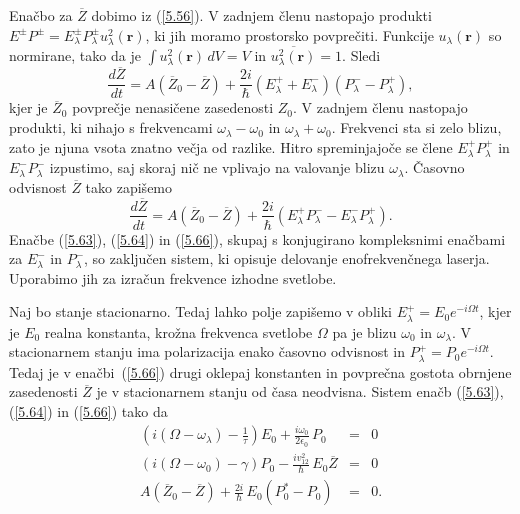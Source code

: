 Enačbo za $\overline{Z}$ dobimo iz (\ref{5.56}). V zadnjem členu nastopajo produkti 
$E^{\pm}P^{\pm}=E_{\lambda}^{\pm}P_{\lambda}^{\pm} u_{\lambda}^2\left(\mathbf{r}\right)$,
ki jih moramo prostorsko povprečiti. Funkcije $u_{\lambda}\left(\mathbf{r}\right)$ so
normirane, tako da je $\int u_{\lambda}^2\left(\mathbf{r}\right) \,dV=V$ in $\overline{u_{\lambda}^2\left(\mathbf{r}\right)}=1$.
Sledi
\begin{equation}  
\label{5.65}
\frac{d\overline{Z}}{dt}= A\left(\overline{Z}_0-\overline{Z}\right)+ \frac{2i}{\hbar}\left(E_{\lambda}^+
+E_{\lambda}^-\right)\left(P_{\lambda}^- - P_{\lambda}^+\right),
\end{equation}
kjer je $\overline{Z}_0$ povprečje nenasičene zasedenosti $Z_0$. V zadnjem
členu nastopajo produkti, ki nihajo s frekvencami $\omega_{\lambda}-
\omega_0$ in $\omega_{\lambda}+ \omega_0$. Frekvenci sta si zelo blizu,
zato je njuna vsota znatno večja od razlike. Hitro spreminjajoče se člene 
$E_{\lambda}^+P_{\lambda}^+$ in $E_{\lambda}^- P_{\lambda}^-$ izpustimo, 
saj skoraj nič ne vplivajo na valovanje blizu $\omega_{\lambda}$. Časovno odvisnost 
$\overline{Z}$ tako zapišemo 
\begin{equation}  
\label{5.66}
\frac{d\overline{Z}}{dt}= A\left(\overline{Z}_0-\overline{Z}\right)+\frac{2i}{\hbar}\left(E_{\lambda}^+
P_{\lambda}^- - E_{\lambda}^- P_{\lambda}^+\right).
\end{equation}
Enačbe (\ref{5.63}), (\ref{5.64}) in (\ref{5.66}), skupaj s konjugirano
kompleksnimi enačbami za $E_{\lambda}^-$ in $P_{\lambda}^-$, so zaključen
sistem, ki opisuje delovanje enofrekvenčnega laserja. Uporabimo jih za
izračun frekvence izhodne svetlobe.

Naj bo stanje stacionarno. Tedaj lahko polje zapišemo v obliki $E_{\lambda
}^{+}=E_{0}e^{-i\Omega t}$, kjer je $E_{0}$ realna konstanta, krožna frekvenca
svetlobe $\Omega$ pa je blizu $\omega _{0}$ in $\omega _{\lambda }$. V
stacionarnem stanju ima polarizacija enako časovno odvisnost in 
$P_{\lambda }^{+}=P_{0}e^{-i\Omega t}$. Tedaj je v enačbi~(\ref{5.66}) drugi
oklepaj konstanten in povprečna gostota obrnjene zasedenosti $\overline{Z}$ je 
v stacionarnem stanju od časa neodvisna. Sistem enačb (\ref{5.63}), (\ref{5.64}) in (\ref{5.66}) 
tako da 
\begin{eqnarray}
\left(i\left(\Omega - \omega_{\lambda}\right)-\frac{1}{\tau}\right) E_{0}+\frac{i\omega _{0}}
{2\epsilon _{0}}\,P_{0} &=&0  \label{5.67} \\
\left(i\left(\Omega-\omega_{0}\right)-\gamma\right)P_{0}-\frac{iv_{12}^{2}}{\hbar}\,E_{0}\overline{Z} &=&0 \\
A\left(\overline{Z}_{0}-\overline{Z}\right)+\frac{2i}{\hbar }\,E_{0}\left(P_{0}^{*}-P_{0}\right) &=&0.
\end{eqnarray}

